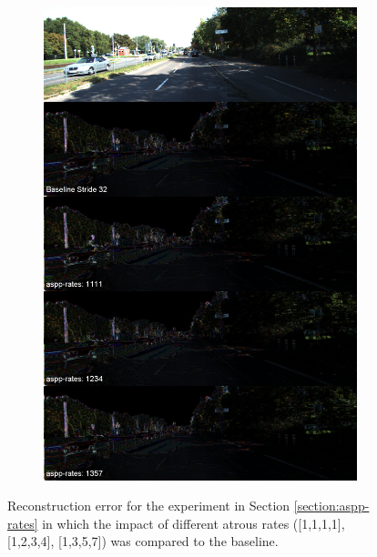 \begin{figure}[h!]
\begin{subfigure}[c]{0.24\textwidth}
\includegraphics[width=\textwidth]{images/visual_comparisons/reconstruction_error/concat_029.png}
\end{subfigure}
\caption{Reconstruction error for the experiment in Section \ref{section:aspp-rates} in which the impact of different atrous rates ([1,1,1,1], [1,2,3,4], [1,3,5,7]) was compared to the baseline.}
\label{appendix:reconstruction-error}
\end{figure}

